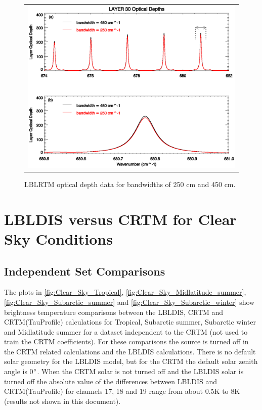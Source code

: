\begin{figure}[htp]
  \centering{}
  \begin{tabular}{c}    
    \includegraphics[bb=97 227 534 568,clip,scale=0.8]{./graphics/Optical_Depth_CO2_30.eps}
  \end{tabular}
  \caption{LBLRTM optical depth data for bandwidths of 250 cm and 450 cm.}
  \label{fig:Optical_Depth_Broad_CO2}
\end{figure}

\newpage{}

\section{LBLDIS versus CRTM for Clear Sky Conditions}

\subsection{Independent Set Comparisons}
The plots in \ref{fig:Clear_Sky_Tropical}, \ref{fig:Clear_Sky_Midlatitude_summer}, \ref{fig:Clear_Sky_Subarctic_summer} and \ref{fig:Clear_Sky_Subarctic_winter} show brightness temperature comparisons between the LBLDIS, CRTM and CRTM(TauProfile) calculations for Tropical, Subarctic summer, Subarctic winter and Midlatitude summer for a dataset independent to the CRTM (not used to train the CRTM coefficients). For these comparisons the source is turned off in the CRTM related calculations and the LBLDIS calculations. There is no default solar geometry for the LBLDIS model, but for the CRTM the default solar zenith angle is 0$^\circ$. When the CRTM solar is not turned off and the LBLDIS solar is turned off the absolute value of the differences between LBLDIS and CRTM(TauProfile) for channels 17, 18 and 19 range from about 0.5K to 8K (results not shown in this document). 


